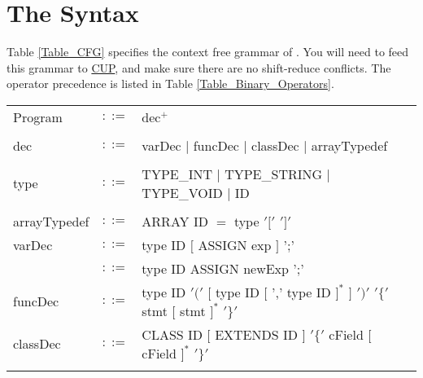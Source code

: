 \documentclass{article}
\begin{document}
\section{The \plname Syntax}
Table \ref{Table_CFG} specifies the context free grammar of \plname.
You will need to feed this grammar to \href{http://www2.cs.tum.edu/projects/cup/}{CUP},
and make sure there are no shift-reduce conflicts.
The operator precedence is listed in Table
\ref{Table_Binary_Operators}. 
\begin{table}[h]
\centering
\begin{tabular}{ l c l }
Program  & $::=$ & dec$^{+}$ \\
\\
dec      & $::=$ & varDec $|$ funcDec $|$ classDec $|$ arrayTypedef \\
\\
type      & $::=$ & TYPE\_INT $|$ TYPE\_STRING $|$ TYPE\_VOID $|$ ID \\
\\
arrayTypedef & $::=$ & ARRAY ID $=$ type $'['$ $']'$ \\
varDec   & $::=$ & type ID $[$ ASSIGN exp $]$ ';' \\
         & $::=$ & type ID ASSIGN newExp ';'      \\
funcDec  & $::=$ & type ID $'('$ $[$ type ID $[$ ',' type ID $]^{*}$ $]$ $')'$ %
                   $'\{'$ stmt   $[$ stmt $]^{*}$ $'\}'$                 \\
classDec & $::=$ & CLASS ID $[$ EXTENDS ID $]$ $'\{'$ cField $[$ cField $]^{*}$ $'\}'$ \\
\\

\end{tabular}
\end{table}
\end{document}
